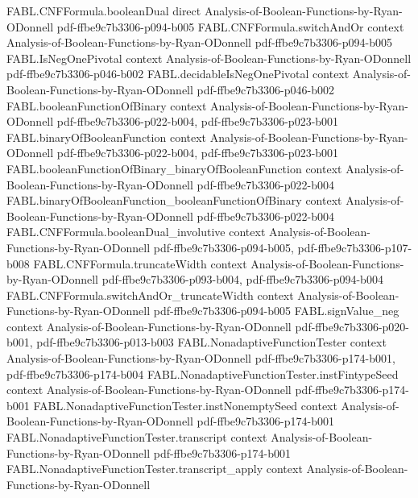 \begin{theorem}
\proofstep
  {FABL.CNFFormula.booleanDual}
  {direct}
  {Analysis-of-Boolean-Functions-by-Ryan-ODonnell}
  {pdf-ffbe9c7b3306-p094-b005}
\proofstep
  {FABL.CNFFormula.switchAndOr}
  {context}
  {Analysis-of-Boolean-Functions-by-Ryan-ODonnell}
  {pdf-ffbe9c7b3306-p094-b005}
\proofstep
  {FABL.IsNegOnePivotal}
  {context}
  {Analysis-of-Boolean-Functions-by-Ryan-ODonnell}
  {pdf-ffbe9c7b3306-p046-b002}
\proofstep
  {FABL.decidableIsNegOnePivotal}
  {context}
  {Analysis-of-Boolean-Functions-by-Ryan-ODonnell}
  {pdf-ffbe9c7b3306-p046-b002}
\proofstep
  {FABL.booleanFunctionOfBinary}
  {context}
  {Analysis-of-Boolean-Functions-by-Ryan-ODonnell}
  {pdf-ffbe9c7b3306-p022-b004,
    pdf-ffbe9c7b3306-p023-b001}
\proofstep
  {FABL.binaryOfBooleanFunction}
  {context}
  {Analysis-of-Boolean-Functions-by-Ryan-ODonnell}
  {pdf-ffbe9c7b3306-p022-b004,
    pdf-ffbe9c7b3306-p023-b001}
\proofstep
  {FABL.booleanFunctionOfBinary_binaryOfBooleanFunction}
  {context}
  {Analysis-of-Boolean-Functions-by-Ryan-ODonnell}
  {pdf-ffbe9c7b3306-p022-b004}
\proofstep
  {FABL.binaryOfBooleanFunction_booleanFunctionOfBinary}
  {context}
  {Analysis-of-Boolean-Functions-by-Ryan-ODonnell}
  {pdf-ffbe9c7b3306-p022-b004}
\proofstep
  {FABL.CNFFormula.booleanDual_involutive}
  {context}
  {Analysis-of-Boolean-Functions-by-Ryan-ODonnell}
  {pdf-ffbe9c7b3306-p094-b005,
    pdf-ffbe9c7b3306-p107-b008}
\proofstep
  {FABL.CNFFormula.truncateWidth}
  {context}
  {Analysis-of-Boolean-Functions-by-Ryan-ODonnell}
  {pdf-ffbe9c7b3306-p093-b004,
    pdf-ffbe9c7b3306-p094-b004}
\proofstep
  {FABL.CNFFormula.switchAndOr_truncateWidth}
  {context}
  {Analysis-of-Boolean-Functions-by-Ryan-ODonnell}
  {pdf-ffbe9c7b3306-p094-b005}
\proofstep
  {FABL.signValue_neg}
  {context}
  {Analysis-of-Boolean-Functions-by-Ryan-ODonnell}
  {pdf-ffbe9c7b3306-p020-b001,
    pdf-ffbe9c7b3306-p013-b003}
\proofstep
  {FABL.NonadaptiveFunctionTester}
  {context}
  {Analysis-of-Boolean-Functions-by-Ryan-ODonnell}
  {pdf-ffbe9c7b3306-p174-b001,
    pdf-ffbe9c7b3306-p174-b004}
\proofstep
  {FABL.NonadaptiveFunctionTester.instFintypeSeed}
  {context}
  {Analysis-of-Boolean-Functions-by-Ryan-ODonnell}
  {pdf-ffbe9c7b3306-p174-b001}
\proofstep
  {FABL.NonadaptiveFunctionTester.instNonemptySeed}
  {context}
  {Analysis-of-Boolean-Functions-by-Ryan-ODonnell}
  {pdf-ffbe9c7b3306-p174-b001}
\proofstep
  {FABL.NonadaptiveFunctionTester.transcript}
  {context}
  {Analysis-of-Boolean-Functions-by-Ryan-ODonnell}
  {pdf-ffbe9c7b3306-p174-b001}
\proofstep
  {FABL.NonadaptiveFunctionTester.transcript_apply}
  {context}
  {Analysis-of-Boolean-Functions-by-Ryan-ODonnell}

\end{theorem}
